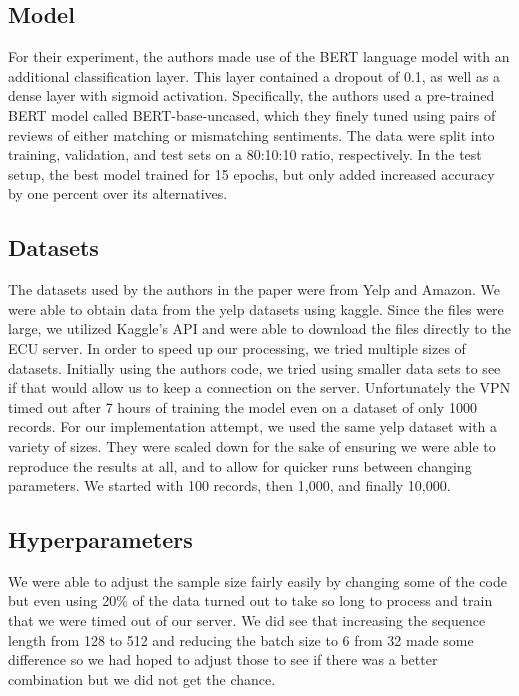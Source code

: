 \documentclass[conference]{IEEEtran}
\begin{document}
\subsection{Model}
	For their experiment, the authors made use of the BERT language model with an additional classification layer. This layer contained a dropout of 0.1, as well as a dense layer with sigmoid activation. Specifically, the authors used a pre-trained BERT model called BERT-base-uncased, which they finely tuned using pairs of reviews of either matching or mismatching sentiments.
	The data were split into training, validation, and test sets on a 80:10:10 ratio, respectively. In the test setup, the best model trained for 15 epochs, but only added increased accuracy by one percent over its alternatives.


\subsection{Datasets}  
	The datasets used by the authors in the paper were from Yelp and Amazon.  We were able to obtain data from the yelp datasets using kaggle.  Since the files were large, we utilized Kaggle’s API and were able to download the files directly to the ECU server. In order to speed up our processing, we tried multiple sizes of datasets.
	Initially using the authors code, we tried using smaller data sets to see if that would allow us to keep a connection on the server. Unfortunately the VPN timed out after 7 hours of training the model even on a dataset of only 1000 records.
	For our implementation attempt, we used the same yelp dataset with a variety of sizes. They were scaled down for the sake of ensuring we were able to reproduce the results at all, and to allow for quicker runs between changing parameters. We started with 100 records, then 1,000, and finally 10,000.

\subsection{Hyperparameters}  
	We were able to adjust the sample size fairly easily by changing some of the code but even using 20\% of the data turned out to take so long to process and train that we were timed out of our server.  We did see that increasing the sequence length from 128 to 512 and reducing the batch size to 6 from 32 made some difference so we had hoped to adjust those to see if there was a better combination but we did not get the chance. 
\end{document}
